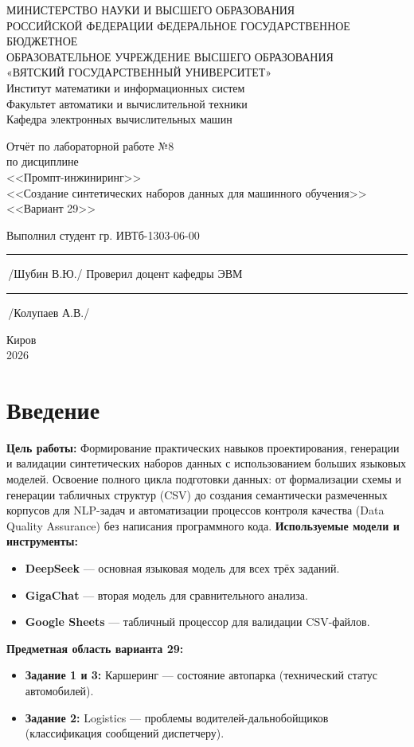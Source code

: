 \documentclass[oneside,a4paper,14pt]{extarticle} %
\begin{document}
	\newpage
	\thispagestyle{empty}
	\begin{center}
		МИНИСТЕРСТВО НАУКИ И ВЫСШЕГО ОБРАЗОВАНИЯ\\
		РОССИЙСКОЙ ФЕДЕРАЦИИ
		ФЕДЕРАЛЬНОЕ ГОСУДАРСТВЕННОЕ БЮДЖЕТНОЕ\\
		ОБРАЗОВАТЕЛЬНОЕ
		УЧРЕЖДЕНИЕ ВЫСШЕГО ОБРАЗОВАНИЯ\\
		«ВЯТСКИЙ ГОСУДАРСТВЕННЫЙ УНИВЕРСИТЕТ»\\
		Институт математики и информационных систем\\
		Факультет автоматики и вычислительной техники\\
		Кафедра электронных вычислительных машин
	\end{center}
	\vspace{20mm}
	\begin{center}
		Отчёт по лабораторной работе №8\\
		по дисциплине\\
		<<Промпт-инжиниринг>>\\
		<<Создание синтетических наборов данных для машинного обучения>>\\
		<<Вариант 29>>\\
	\end{center}
	\vspace{48mm}
	\noindent
	Выполнил студент гр. ИВТб-1303-06-00 \hfill \rule[-0.5mm]{30mm}{0.15mm}\,/Шубин В.Ю./
	\newline
	Проверил доцент кафедры ЭВМ \hfill \rule[-0.5mm]{30mm}{0.15mm}\,/Колупаев А.В./
	\vfill
	\begin{center}
		Киров\\
		2026
	\end{center}
	\newpage
	\thispagestyle{empty}
	\section*{Введение}
	\noindent
	\textbf{Цель работы:} Формирование практических навыков проектирования, генерации и валидации синтетических наборов данных с использованием больших языковых моделей. Освоение полного цикла подготовки данных: от формализации схемы и генерации табличных структур (CSV) до создания семантически размеченных корпусов для NLP-задач и автоматизации процессов контроля качества (Data Quality Assurance) без написания программного кода.
	\noindent
	\textbf{Используемые модели и инструменты:}
	\begin{itemize}
		\item \textbf{DeepSeek} --- основная языковая модель для всех трёх заданий.
		\item \textbf{GigaChat} --- вторая модель для сравнительного анализа.
		\item \textbf{Google Sheets} --- табличный процессор для валидации CSV-файлов.
	\end{itemize}
	\noindent
	\textbf{Предметная область варианта 29:}
	\begin{itemize}
		\item \textbf{Задание 1 и 3:} Каршеринг --- состояние автопарка (технический статус автомобилей).
		\item \textbf{Задание 2:} Logistics --- проблемы водителей-дальнобойщиков (классификация сообщений диспетчеру).
	\end{itemize}
	\newpage
\end{document}

